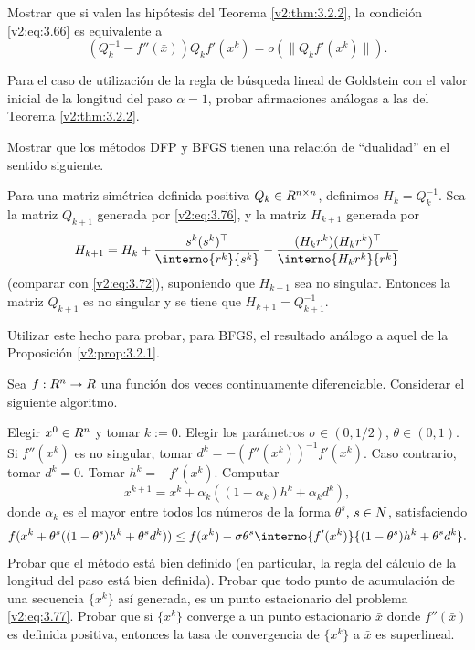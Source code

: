 \begin{exercise}\label{v2:ejer:3.2.10}
    Mostrar que si valen las hipótesis del Teorema \ref{v2:thm:3.2.2}, la condición \eqref{v2:eq:3.66} es equivalente a
    \begin{equation}
        (Q_k^{-1} - f''(\bar{x}))Q_k f'(x^k) = o(\|Q_k f'(x^k)\|).
        \label{v2:eq:3.69}
    \end{equation}
\end{exercise}

\begin{exercise}\label{v2:ejer:3.2.11}
    Para el caso de utilización de la regla de búsqueda lineal de Goldstein con el valor inicial de la longitud del paso $\alpha = 1$, probar afirmaciones análogas a las del Teorema \ref{v2:thm:3.2.2}.
\end{exercise}

\begin{exercise}\label{v2:ejer:3.2.12}
    Mostrar que los métodos DFP y BFGS tienen una relación de ``dualidad'' en el sentido siguiente.
    
    Para una matriz simétrica definida positiva $Q_k \in R^{n \times n}$, definimos $H_k = Q_k^{-1}$. Sea la matriz $Q_{k+1}$ generada por \eqref{v2:eq:3.76}, y la matriz $H_{k+1}$ generada por
    \[
        H_{k+1} = H_k + \frac{s^k (s^k)^\top}{\interno{r^k}{s^k}} - \frac{(H_k r^k)(H_k r^k)^\top}{\interno{H_k r^k}{r^k}}
    \]
    (comparar con \eqref{v2:eq:3.72}), suponiendo que $H_{k+1}$ sea no singular. Entonces la matriz $Q_{k+1}$ es no singular y se tiene que $H_{k+1} = Q_{k+1}^{-1}$.
    
    Utilizar este hecho para probar, para BFGS, el resultado análogo a aquel de la Proposición \ref{v2:prop:3.2.1}.
\end{exercise}

\begin{exercise}\label{v2:ejer:3.3.1}
    Sea $f : R^n \to R$ una función dos veces continuamente diferenciable. Considerar el siguiente algoritmo.
    
    Elegir $x^0 \in R^n$ y tomar $k := 0$. Elegir los parámetros $\sigma \in (0, 1/2)$, $\theta \in (0, 1)$. Si $f''(x^k)$ es no singular, tomar $d^k = -(f''(x^k))^{-1} f'(x^k)$. Caso contrario, tomar $d^k = 0$. Tomar $h^k = -f'(x^k)$. Computar
    \[
        x^{k+1} = x^k + \alpha_k ((1 - \alpha_k)h^k + \alpha_k d^k),
    \]
    donde $\alpha_k$ es el mayor entre todos los números de la forma $\theta^s$, $s \in N$, satisfaciendo
    \[
        f(x^k + \theta^s ((1 - \theta^s)h^k + \theta^s d^k)) \le f(x^k) - \sigma \theta^s \interno{f'(x^k)}{(1 - \theta^s)h^k + \theta^s d^k}.
    \]
    Probar que el método está bien definido (en particular, la regla del cálculo de la longitud del paso está bien definida). Probar que todo punto de acumulación de una secuencia $\{x^k\}$ así generada, es un punto estacionario del problema \eqref{v2:eq:3.77}. Probar que si $\{x^k\}$ converge a un punto estacionario $\bar{x}$ donde $f''(\bar{x})$ es definida positiva, entonces la tasa de convergencia de $\{x^k\}$ a $\bar{x}$ es superlineal.
\end{exercise}

